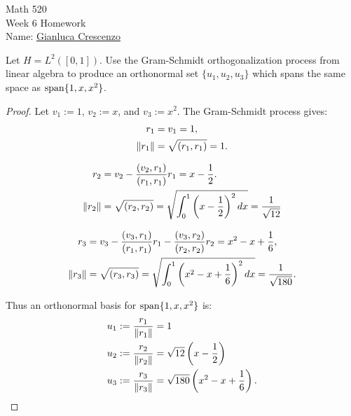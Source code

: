 \documentclass[10pt,oneside,openany]{memoir}
\begin{document}
\begin{center}
    {\large Math 520 \\[0.1in]Week 6 Homework}\\[.175in]
    {Name:} {\underline{Gianluca Crescenzo\hspace*{2in}}}\\[0.15in]
    \end{center}
    \vspace{4pt}
\begin{exercise}
Let $H = L^2([0,1])$. Use the Gram-Schmidt orthogonalization process from linear algebra to produce an orthonormal set $\{u_1,u_2,u_3\}$ which spans the same space as $\operatorname{span}\{1,x,x^2\}$.
\end{exercise}
\begin{proof}
    Let $v_1 := 1$, $v_2 := x$, and $v_3 := x^2$. The Gram-Schmidt process gives:
        \begin{equation*}
        \begin{split}
            r_1 &= v_1 = 1, \\
            \left\lVert r_1 \right\rVert &= \sqrt{(r_1,r_1)} = 1.
        \end{split}
        \end{equation*}

        \begin{equation*}
        \begin{split}
            r_2 &= v_2 - \frac{(v_2,r_1)}{(r_1,r_1)} r_1  = x - \frac{1}{2}. \\
            \left\lVert r_2 \right\rVert &= \sqrt{(r_2,r_2)} = \sqrt{\int_0^1 \left(x-\frac12\right)^2 dx} = \frac{1}{\sqrt{12}}
        \end{split}
        \end{equation*}

        \begin{equation*}
        \begin{split}
            r_3 &= v_3 - \frac{(v_3,r_1)}{(r_1,r_1)} r_1 - \frac{(v_3,r_2)}{(r_2,r_2)} r_2 = x^2 - x + \frac{1}{6}, \\
            \left\lVert r_3 \right\rVert & = \sqrt{(r_3,r_3)} = \sqrt{\int_0^1 \left(x^2-x+\frac16\right)^2 dx} = \frac{1}{\sqrt{180}}.
        \end{split}
        \end{equation*}

        Thus an orthonormal basis for $\operatorname{span}\{1,x,x^2\}$ is:
            \begin{equation*}
            \begin{split}
                u_1 &:= \frac{r_1}{\left\lVert r_1 \right\rVert} = 1 \\
                u_2 &:= \frac{r_2}{\left\lVert r_2 \right\rVert} = \sqrt{12}\left(x-\frac{1}{2}\right) \\
                u_3 &:= \frac{r_3}{\left\lVert r_3 \right\rVert} = \sqrt{180} \left( x^2 - x + \frac{1}{6} \right). \qedhere
            \end{split}
            \end{equation*}
    \end{proof}
\end{document}
